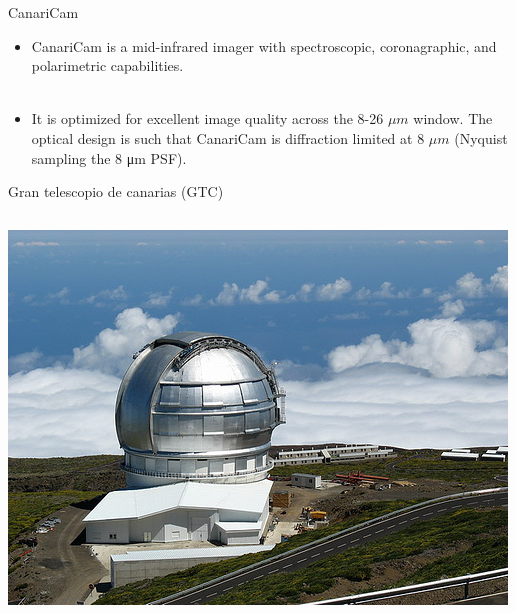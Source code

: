 \documentclass{beamer}
\begin{document}
\begin{frame}{CanariCam}

\begin{itemize}
\item CanariCam is a mid-infrared imager with spectroscopic, coronagraphic, and polarimetric capabilities. \\~\\

\item It is optimized for excellent image quality across the 8-26 $\mu m$  window. The optical design is such that CanariCam is diffraction limited at 8 $\mu m$ (Nyquist sampling the 8 μm PSF).
\end{itemize}
\end{frame}


\begin{frame}{Gran telescopio de canarias (GTC)}
\begin{columns}
\begin{column}{0.45\textwidth}
\begin{center}
\includegraphics[scale=0.30]{imgr2.png}
\end{center}
\end{column}


\end{columns}
\end{frame}
\end{document}
